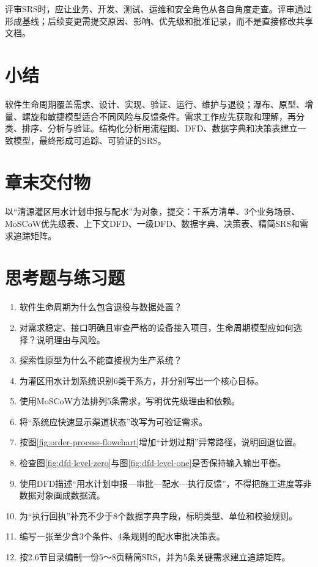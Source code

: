 评审SRS时，应让业务、开发、测试、运维和安全角色从各自角度走查。评审通过形成基线；后续变更需提交原因、影响、优先级和批准记录，而不是直接修改共享文档。

\section*{小结}

软件生命周期覆盖需求、设计、实现、验证、运行、维护与退役；瀑布、原型、增量、螺旋和敏捷模型适合不同风险与反馈条件。需求工作应先获取和理解，再分类、排序、分析与验证。结构化分析用流程图、DFD、数据字典和决策表建立一致模型，最终形成可追踪、可验证的SRS。

\section*{章末交付物}

以“清源灌区用水计划申报与配水”为对象，提交：干系方清单、3个业务场景、MoSCoW优先级表、上下文DFD、一级DFD、数据字典、决策表、精简SRS和需求追踪矩阵。

\section*{思考题与练习题}

\begin{enumerate}
\item 软件生命周期为什么包含退役与数据处置？
\item 对需求稳定、接口明确且审查严格的设备接入项目，生命周期模型应如何选择？说明理由与风险。
\item 探索性原型为什么不能直接视为生产系统？
\item 为灌区用水计划系统识别6类干系方，并分别写出一个核心目标。
\item 使用MoSCoW方法排列5条需求，写明优先级理由和依赖。
\item 将“系统应快速显示渠道状态”改写为可验证需求。
\item 按图\ref{fig:order-process-flowchart}增加“计划过期”异常路径，说明回退位置。
\item 检查图\ref{fig:dfd-level-zero}与图\ref{fig:dfd-level-one}是否保持输入输出平衡。
\item 使用DFD描述“用水计划申报—审批—配水—执行反馈”，不得把施工进度等非数据对象画成数据流。
\item 为“执行回执”补充不少于8个数据字典字段，标明类型、单位和校验规则。
\item 编写一张至少含3个条件、4条规则的配水审批决策表。
\item 按2.6节目录编制一份5～8页精简SRS，并为5条关键需求建立追踪矩阵。
\end{enumerate}
